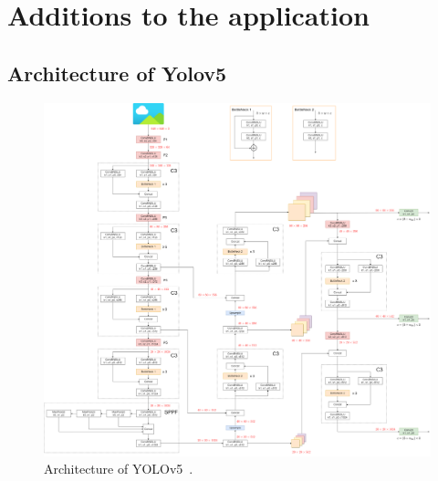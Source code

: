 \chapter{Additions to the application}\label{chpt:applicationAdditions}
\glsresetall

\section{Architecture of Yolov5}\label{sec:aa:archyolov5}

\begin{figure}[H]
	\centering
	\includegraphics[width=1.0\linewidth]{images/a01-arch-yolov5}
	\caption[Architecture of YOLOv5.]{Architecture of YOLOv5~\cite{archYolov5}.}
	\label{fig:aa:archyolov5}
\end{figure}

